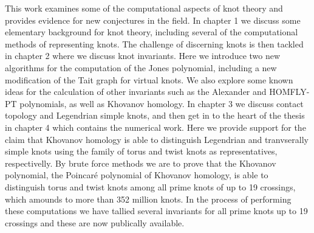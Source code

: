 This work examines some of the computational aspects of knot theory and
provides evidence for new conjectures in the field. In chapter 1 we discuss
some elementary background for knot theory, including several of the
computational methods of representing knots. The challenge of discerning knots
is then tackled in chapter 2 where we discuss knot invariants. Here we introduce
two new algorithms for the computation of the Jones polynomial, including a
new modification of the Tait graph for virtual knots. We also explore some
known ideas for the calculation of other invariants such as the Alexander and
HOMFLY-PT polynomials, as well as Khovanov homology. In chapter 3 we discuss
contact topology and Legendrian simple knots, and then get in to the heart of
the thesis in chapter 4 which contains the numerical work. Here we provide
support for the claim that Khovanov homology is able to distinguish Legendrian
and tranvserally simple knots using the family of torus and twist knots as
representatives, respectivelly. By brute force methods we are to prove that
the Khovanov polynomial, the Poincar\'{e} polynomial of Khovanov homology, is
able to distinguish torus and twist knots among all prime knots of up to 19
crossings, which amounds to more than 352 million knots. In the process of
performing these computations we have tallied several invariants for all
prime knots up to 19 crossings and these are now publically available.

